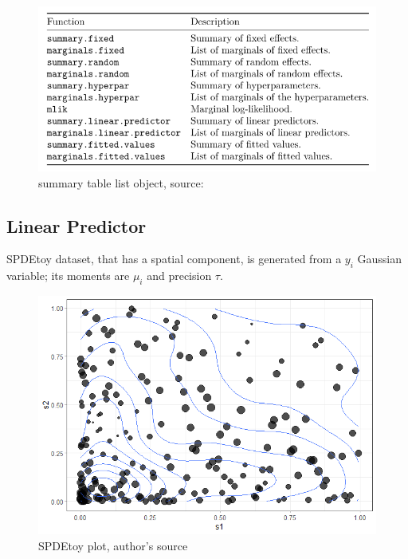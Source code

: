 \documentclass[
  12pt,
  a4paper,
  oneside]{book}
\theoremstyle{definition}
\theoremstyle{definition}
\theoremstyle{definition}
\theoremstyle{remark}
\begin{document}
\begin{figure}
\centering
\includegraphics{images/summarytable.PNG}
\caption{summary table list object, source: \citet{Krainski-Rubio}}
\end{figure}

\hypertarget{example}{%
\subsection{Linear Predictor}\label{example}}

SPDEtoy dataset, that has a spatial component, is generated from a \(y_{i}\) Gaussian variable; its moments are \(\mu_{i}\) and precision \(\tau\).

\begin{figure}
\centering
\includegraphics{images/cotour_toy.png}
\caption{SPDEtoy plot, author's source}
\end{figure}
\end{document}
